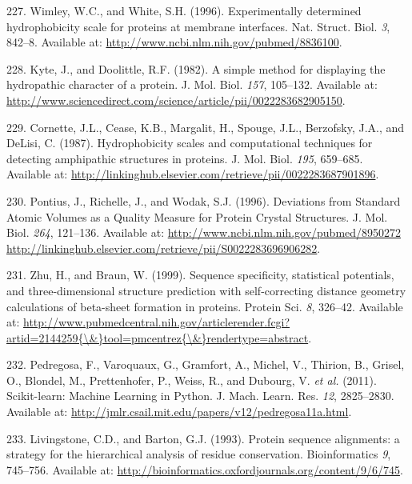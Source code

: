 \documentclass[11pt,a4paper,twoside]{book}
\theoremstyle{definition}
\theoremstyle{definition}
\theoremstyle{remark}
\begin{document}
\hypertarget{ref-Wimley1996}{}
227. Wimley, W.C., and White, S.H. (1996). Experimentally determined
hydrophobicity scale for proteins at membrane interfaces. Nat. Struct.
Biol. \emph{3}, 842--8. Available at:
\url{http://www.ncbi.nlm.nih.gov/pubmed/8836100}.

\hypertarget{ref-Kyte1982}{}
228. Kyte, J., and Doolittle, R.F. (1982). A simple method for
displaying the hydropathic character of a protein. J. Mol. Biol.
\emph{157}, 105--132. Available at:
\url{http://www.sciencedirect.com/science/article/pii/0022283682905150}.

\hypertarget{ref-Cornette1987}{}
229. Cornette, J.L., Cease, K.B., Margalit, H., Spouge, J.L., Berzofsky,
J.A., and DeLisi, C. (1987). Hydrophobicity scales and computational
techniques for detecting amphipathic structures in proteins. J. Mol.
Biol. \emph{195}, 659--685. Available at:
\url{http://linkinghub.elsevier.com/retrieve/pii/0022283687901896}.

\hypertarget{ref-Pontius1996}{}
230. Pontius, J., Richelle, J., and Wodak, S.J. (1996). Deviations from
Standard Atomic Volumes as a Quality Measure for Protein Crystal
Structures. J. Mol. Biol. \emph{264}, 121--136. Available at:
\href{http://www.ncbi.nlm.nih.gov/pubmed/8950272\%20http://linkinghub.elsevier.com/retrieve/pii/S0022283696906282}{http://www.ncbi.nlm.nih.gov/pubmed/8950272 http://linkinghub.elsevier.com/retrieve/pii/S0022283696906282}.

\hypertarget{ref-Zhu1999}{}
231. Zhu, H., and Braun, W. (1999). Sequence specificity, statistical
potentials, and three-dimensional structure prediction with
self-correcting distance geometry calculations of beta-sheet formation
in proteins. Protein Sci. \emph{8}, 326--42. Available at:
\href{http://www.pubmedcentral.nih.gov/articlerender.fcgi?artid=2144259\%7B/\&\%7Dtool=pmcentrez\%7B/\&\%7Drendertype=abstract}{http://www.pubmedcentral.nih.gov/articlerender.fcgi?artid=2144259\{\textbackslash{}\&\}tool=pmcentrez\{\textbackslash{}\&\}rendertype=abstract}.

\hypertarget{ref-Pedregosa2011}{}
232. Pedregosa, F., Varoquaux, G., Gramfort, A., Michel, V., Thirion,
B., Grisel, O., Blondel, M., Prettenhofer, P., Weiss, R., and Dubourg,
V. \emph{et al.} (2011). Scikit-learn: Machine Learning in Python. J.
Mach. Learn. Res. \emph{12}, 2825--2830. Available at:
\url{http://jmlr.csail.mit.edu/papers/v12/pedregosa11a.html}.

\hypertarget{ref-Livingstone1993}{}
233. Livingstone, C.D., and Barton, G.J. (1993). Protein sequence
alignments: a strategy for the hierarchical analysis of residue
conservation. Bioinformatics \emph{9}, 745--756. Available at:
\url{http://bioinformatics.oxfordjournals.org/content/9/6/745}.
\end{document}
